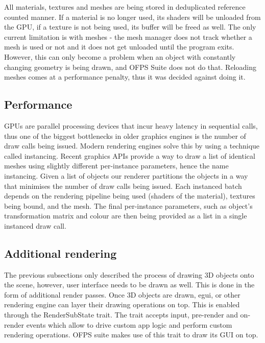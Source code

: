 \documentclass[11pt,english]{report}
\begin{document}
All materials, textures and meshes are being stored in deduplicated reference counted manner. If a material is no longer used, its shaders will be unloaded from the GPU, if a texture is not being used, its buffer will be freed as well. The only current limitation is with meshes - the mesh manager does not track whether a mesh is used or not and it does not get unloaded until the program exits. However, this can only become a problem when an object with constantly changing geometry is being drawn, and OFPS Suite does not do that. Reloading meshes comes at a performance penalty, thus it was decided against doing it.

\subsection{Performance}

GPUs are parallel processing devices that incur heavy latency in sequential calls, thus one of the biggest bottlenecks in older graphics engines is the number of draw calls being issued. Modern rendering engines solve this by using a technique called instancing. Recent graphics APIs provide a way to draw a list of identical meshes using slightly different per-instance parameters, hence the name instancing. Given a list of objects our renderer partitions the objects in a way that minimises the number of draw calls being issued. Each instanced batch depends on the rendering pipeline being used (shaders of the material), textures being bound, and the mesh. The final per-instance parameters, such as object's transformation matrix and colour are then being provided as a list in a single instanced draw call.

\subsection{Additional rendering}

The previous subsections only described the process of drawing 3D objects onto the scene, however, user interface needs to be drawn as well. This is done in the form of additional render passes. Once 3D objects are drawn, egui, or other rendering engine can layer their drawing operations on top. This is enabled through the RenderSubState trait. The trait accepts input, pre-render and on-render events which allow to drive custom app logic and perform custom rendering operations. OFPS suite makes use of this trait to draw its GUI on top.
\end{document}
